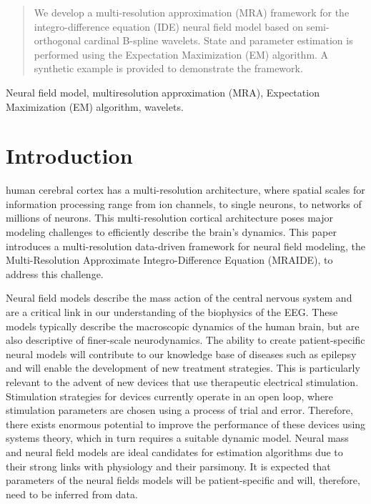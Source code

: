 \documentclass[journal]{IEEEtran}
\begin{document}
\begin{abstract}
We develop a multi-resolution approximation (MRA) framework for the integro-difference equation (IDE) neural field model based on semi-orthogonal cardinal B-spline wavelets. State and parameter estimation is performed using the Expectation Maximization (EM) algorithm. A synthetic example is provided
to demonstrate the framework.
\end{abstract}
 \begin{IEEEkeywords}
  Neural field model, multiresolution approximation (MRA), Expectation Maximization (EM) algorithm, wavelets.
  \end{IEEEkeywords}
%
\IEEEpeerreviewmaketitle


\section{Introduction}
 human cerebral cortex has a multi-resolution architecture, where spatial scales for information processing range from ion channels, to single neurons, to networks of millions of neurons. This multi-resolution cortical architecture poses major modeling challenges to efficiently describe the brain's dynamics. This paper introduces a multi-resolution data-driven framework for neural field modeling, the Multi-Resolution Approximate Integro-Difference Equation (MRAIDE), to address this challenge. 

Neural field models describe the mass action of the central nervous system and are a critical link in our understanding of the biophysics of the EEG. These models typically describe the macroscopic dynamics of the human brain, but are also descriptive of finer-scale neurodynamics. The ability to create patient-specific neural models will contribute to our knowledge base of diseases such as epilepsy and will enable the development of new treatment strategies. This is particularly relevant to the advent of new devices that use therapeutic electrical stimulation. Stimulation strategies for devices currently operate in an open loop, where stimulation parameters are chosen using a process of trial and error. Therefore, there exists enormous potential to improve the performance of these devices using systems theory, which in turn requires a suitable dynamic model. Neural mass and neural field models are ideal candidates for estimation algorithms due to their strong links with physiology and their parsimony. It is expected that parameters of the neural fields models will be patient-specific and will, therefore, need to be inferred from data.
\end{document}
